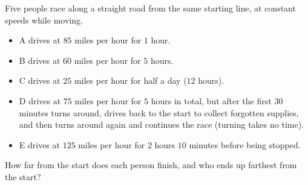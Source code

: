 Five people race along a straight road from the same starting line, at constant speeds while moving.
\begin{itemize}
\item A drives at $85$ miles per hour for $1$ hour.
\item B drives at $60$ miles per hour for $5$ hours.
\item C drives at $25$ miles per hour for half a day ($12$ hours).
\item D drives at $75$ miles per hour for $5$ hours in total, but after the first $30$ minutes turns around, drives back to the start to collect forgotten supplies, and then turns around again and continues the race (turning takes no time).
\item E drives at $125$ miles per hour for $2$ hours $10$ minutes before being stopped.
\end{itemize}
How far from the start does each person finish, and who ends up farthest from the start?
